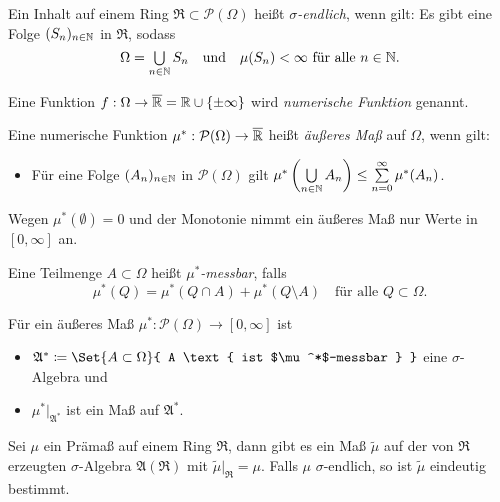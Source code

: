 \documentclass{cheat-sheet}
\newcommand{\PS}{\mathcal{P}} %
\newcommand{\PSO}{\PS(\Omega)} %
\newcommand{\Alg}{\mathfrak{A}} %
\newcommand{\Ring}{\mathfrak{R}} %
\begin{document}
\begin{defn}
  Ein Inhalt auf einem Ring $\Ring \subset \PSO$ heißt \emph{$\sigma$-endlich}, wenn gilt: Es gibt eine Folge $(S_n)_{n \in \mathbb{N}}$ in $\Ring$, sodass
  \[
      \Omega = \bigcup_{n \in \N} S_n
      \quad \text{und} \quad
      \mu(S_n) < \infty \text{ für alle } n \in \N.
  \]
\end{defn}

\begin{defn}
  Eine Funktion $f : \Omega \to \overline{\mathbb{R}} = \mathbb{R} \cup \{ \pm \infty \}$ wird \emph{numerische Funktion} genannt.
\end{defn}

\begin{defn}
  Eine numerische Funktion $\mu^* : \PSO \to \overline{\R}$ heißt \emph{äußeres Maß} auf $\Omega$, wenn gilt:
  \begin{itemize}
    \item Für eine Folge $(A_n)_{n \in \mathbb{N}}$ in $\mathcal{P}(\Omega)$ gilt $\mu^*\left(\bigcup_{n \in \N} A_n \right) \leq \sum_{n = 0}^\infty \mu^*(A_n)$. %
  \end{itemize}
\end{defn}

\begin{bem}
  Wegen $\mu^*(\emptyset) = 0$ und der Monotonie nimmt ein äußeres Maß nur Werte in $[0, \infty]$ an.
\end{bem}

\begin{defn}
  Eine Teilmenge $A \subset \Omega$ heißt \emph{$\mu^*$-messbar}, falls
  \[ \mu^*(Q) = \mu^*(Q \cap A) + \mu^*(Q \setminus A) \quad \text{für alle } Q \subset \Omega. \]
\end{defn}

\begin{satz}[Carathéodory]
  Für ein äußeres Maß $\mu^* : \PSO \to [0, \infty]$ ist
  \begin{itemize}
    \item $\Alg^* \coloneqq \Set{ A \subset \Omega }{ A \text{ ist $\mu^*$-messbar } }$ eine $\sigma$-Algebra und
    \item $\mu^*|_{\Alg^*}$ ist ein Maß auf $\Alg^*$.
  \end{itemize}
\end{satz}

\begin{satz}
  Sei $\mu$ ein Prämaß auf einem Ring $\Ring$, dann gibt es ein Maß $\tilde{\mu}$ auf der von $\Ring$ erzeugten $\sigma$-Algebra $\Alg(\Ring)$ mit $\tilde{\mu}|_\Ring = \mu$. Falls $\mu$ $\sigma$-endlich, so ist $\tilde{\mu}$ eindeutig bestimmt.
\end{satz}
\end{document}
